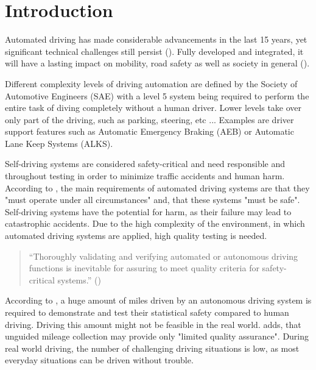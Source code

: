 \chapter{Introduction}
Automated driving has made considerable advancements in the last 15 years, yet significant technical challenges still persist (\cite{ayoub_manual_2019}).
Fully developed and integrated, it will have a lasting impact on mobility, road safety as well as society in general (\cite{milakis_policy_2017}).

Different complexity levels of driving automation are defined by the Society of Automotive Engineers (SAE)  with a level 5 system being required to perform the entire task of diving completely without a human driver. Lower levels take over only part of the driving, such as parking, steering, etc ... Examples are driver support features such as Automatic Emergency Braking (AEB) or Automatic Lane Keep Systems (ALKS).

Self-driving systems are considered safety-critical and need responsible and throughout testing in order to minimize traffic accidents and human harm. According to \cite{kluck_search-based_2022}, the main requirements of automated driving systems are that they "must operate under all circumstances" and, that these systems "must be safe". Self-driving systems have the potential for harm, as their failure may lead to catastrophic accidents. Due to the high complexity of the environment, in which automated driving systems are applied, high quality testing is needed. 

\begin{quote}
	\begin{em}
		\enquote{Thoroughly validating and verifying automated or autonomous driving functions is inevitable for assuring to meet quality criteria for safety-critical systems.} (\cite{felbinger_comparing_2019})
	\end{em}
\end{quote}

According to \cite{kalra_driving_2016}, a huge amount of miles driven by an autonomous driving system is required to demonstrate and test their statistical safety compared to human driving. Driving this amount might not be feasible in the real world.
\cite{kluck_search-based_2022} adds, that unguided mileage collection may provide only "limited quality assurance". During real world driving, the number of challenging driving situations is low, as most everyday situations can be driven without trouble.

